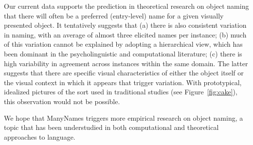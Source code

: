 

Our current data supports the prediction in theoretical research on object naming that there will often be a preferred (entry-level) name for a given visually presented object.
It tentatively suggests that (a) there is also consistent variation in naming, with an average of almost three elicited names per instance; (b) much of this variation cannot be explained by adopting a hierarchical view, which has been dominant in the psycholinguistic and computational literature; (c) there is high variability in agreement across instances within the same domain.
The latter suggests that there are specific visual characteristics of either the object itself or the visual context in which it appears that trigger variation. With prototypical, idealized pictures of the sort used in traditional studies (see Figure\ \ref{fig:cake}), this observation would not be possible.

We hope that ManyNames triggers more empirical research on object naming, a topic that has been understudied in both computational and theoretical approaches to language.

